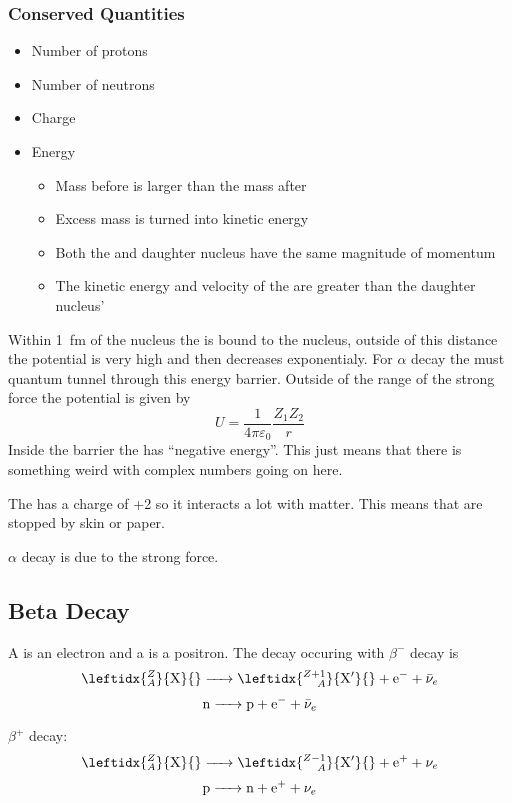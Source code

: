 \subsubsection*{Conserved Quantities}
\begin{itemize}
\item Number of protons
\item Number of neutrons
\item Charge
\item Energy
\begin{itemize}
\item Mass before is larger than the mass after
\item Excess mass is turned into kinetic energy
\item Both the \aparticle and daughter nucleus have the same magnitude of momentum
\item The kinetic energy and velocity of the \aparticle are greater than the daughter nucleus'
\end{itemize}
\end{itemize}

Within \SI{1}{fm} of the nucleus the \aparticle is bound to the nucleus, outside of this distance the potential is very high and then decreases exponentialy. For \(\alpha\) decay the \aparticle must quantum tunnel through this energy barrier. Outside of the range of the strong force the potential is given by
\[U=\frac{1}{4\pi\varepsilon_0}\frac{Z_1Z_2}{r}\]
 Inside the barrier the \aparticle has ``negative energy''. This just means that there is something weird with complex numbers going on here.
 
The \aparticle has a charge of +2 so it interacts a lot with matter. This means that \aparticles are stopped by skin or paper.

\(\alpha\) decay is due to the strong force.

\subsection*{Beta Decay}

A \bmparticle is an electron and a \bmparticle is a positron. The decay occuring with \(\beta^-\) decay is
\[\leftidx{^Z_A}{\mathrm{X}}{}\ce{->}\leftidx{_{\hphantom{{}+1}A}^{Z+1}}{\mathrm{X}'}{}+\electron+\antineutrino[e]\]
\[\neutron\ce{->}\proton+\electron+\antineutrino[e]\]

\(\beta^+\) decay:
\[\leftidx{^Z_A}{\mathrm{X}}{}\ce{->}\leftidx{_{\hphantom{{}-1}A}^{Z-1}}{\mathrm{X}'}{}+\positron+\neutrino[e]\]
\[\proton\ce{->}\neutron+\positron+\neutrino[e]\]

